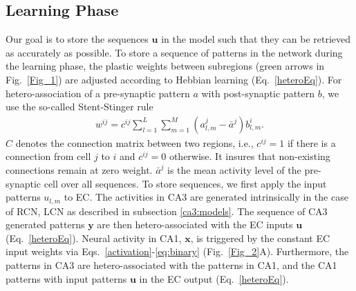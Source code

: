 \documentclass[utf8]{frontiersSCNS} %
\begin{document}
\subsection{Learning Phase}
\label{learning}
Our goal is to store the sequences $\mathbf u$ in the model such that they can be retrieved as accurately as possible. To store a sequence of patterns in the network during the learning phase, the plastic weights between subregions (green arrows in Fig.~\ref{Fig_1}) are adjusted according to Hebbian learning (Eq.~\ref{heteroEq}). 
For hetero-association of a pre-synaptic pattern $a$ with post-synaptic pattern $b$, we use the so-called Stent-Stinger rule \citep{stent1973physiological}
%
\begin{align}
	\label{heteroEq}
	w^{ij} = c^{ij}\sum_{l=1}^L{\sum_{m=1}^M(a^j_{l, m}  - \bar {a}^j)b_{l, m}^i}.
\end{align}
$C$ denotes the connection matrix between two regions, i.e., $c^{ij} = 1$ if there is a connection from cell $j$ to $i$ and $c^{ij} = 0$ otherwise. It insures that non-existing connections remain at zero weight. $\bar{a}^j$ is the mean activity level of the pre-synaptic cell over all sequences. 
%
To store sequences, we first apply the input patterns $u_{l,m}$ to EC. The activities in CA3 are generated intrinsically in the case of RCN, LCN as described in subsection \ref{ca3:models}. The sequence of CA3 generated patterns $\mathbf y$ are then hetero-associated with the EC inputs $\mathbf u$ (Eq.~\ref{heteroEq}). %
Neural activity in CA1, $\mathbf x$, is triggered by the constant EC input weights via Eqs.~\ref{activation}-\ref{eq:binary} (Fig.~\ref{Fig_2}A). Furthermore, the patterns in CA3 are hetero-associated with the patterns in CA1, and the CA1 patterns with input patterns $\mathbf u$ in the EC output (Eq.~\ref{heteroEq}). 
\end{document}
